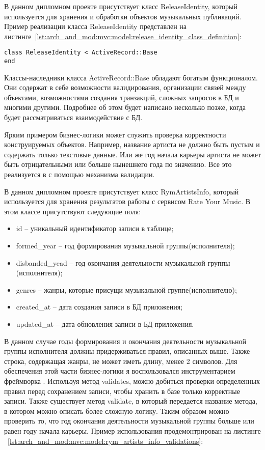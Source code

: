 В данном дипломном проекте присутствует класс ReleaseIdentity, который используется для хранения и обработки объектов музыкальных публикаций. Пример реализации класса ReleaseIdentity представлен на листинге~\ref{lst:arch_and_mod:mvc:model:release_identity_class_definition}:
\begin{lstlisting}[style=fsharpstyle,caption={Базовая реализация класса ReleaseIdentity}, label=lst:arch_and_mod:mvc:model:release_identity_class_definition]
class ReleaseIdentity < ActiveRecord::Base
end
\end{lstlisting}

Классы-наследники класса ActiveRecord::Base обладают богатым функционалом. Они содержат в себе возможности валидирования, организации связей между объектами, возможностями создания транзакций, сложных запросов в БД и многими другими. Подробнее об этом будет написано несколько позже, когда будет рассматриваться взаимодействие с БД.

Ярким примером бизнес-логики может служить проверка корректности конструируемых объектов. Например, название артиста не должно быть пустым и содержать только текстовые данные. Или же год начала карьеры артиста не может быть отрицательными или больше нынешнего года по значению. Все это реализуется в \ror{} с помощью механизма валидации.

В данном дипломном проекте присутствует класс RymArtistsInfo, который используется для хранения результатов работы с сервисом Rate Your Music. В этом классе присутствуют следующие поля:

\begin{itemize}
  \item id -- уникальный идентификатор записи в таблице;
  \item formed\_year -- год формирования музыкальной группы(исполнителя);
  \item disbanded\_yead -- год окончания деятельности музыкальной группы (исполнителя);
  \item genres -- жанры, которые присущи музыкальной группе(исполнителю);
  \item created\_at -- дата создания записи в БД приложения;
  \item updated\_at -- дата обновления записи в БД приложения.
\end{itemize}

В данном случае годы формирования и окончания деятельности музыкальной группы исполнителя должны придерживаться правил, описанных выше. Также строка, содержащая жанры, не может иметь длину, менее 2 символов. Для обеспечения этой части бизнес-логики я воспользовался инструментарием фреймворка \ror{}. Используя метод validates, можно добиться проверки определенных правил перед сохранением записи, чтобы хранить в базе только корректные записи. Также существует метод validate, в который передается название метода, в котором можно описать более сложную логику. Таким образом можно проверить то, что год окончания деятельности музыкальной группы больше или равен году начала карьеры. Пример использования продемонтрирован на листинге ~\ref{lst:arch_and_mod:mvc:model:rym_artists_info_validations}:

